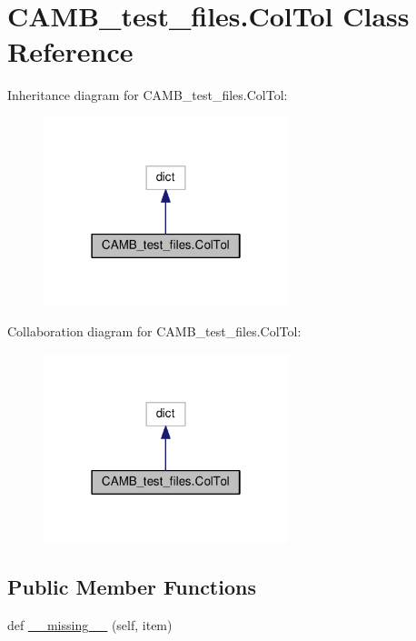 \hypertarget{classCAMB__test__files_1_1ColTol}{}\section{C\+A\+M\+B\+\_\+test\+\_\+files.\+Col\+Tol Class Reference}
\label{classCAMB__test__files_1_1ColTol}


Inheritance diagram for C\+A\+M\+B\+\_\+test\+\_\+files.\+Col\+Tol\+:
\nopagebreak
\begin{figure}[H]
\begin{center}
\leavevmode
\includegraphics[width=202pt]{classCAMB__test__files_1_1ColTol__inherit__graph}
\end{center}
\end{figure}


Collaboration diagram for C\+A\+M\+B\+\_\+test\+\_\+files.\+Col\+Tol\+:
\nopagebreak
\begin{figure}[H]
\begin{center}
\leavevmode
\includegraphics[width=202pt]{classCAMB__test__files_1_1ColTol__coll__graph}
\end{center}
\end{figure}
\subsection*{Public Member Functions}
\begin{DoxyCompactItemize}
\item 
def \mbox{\hyperlink{classCAMB__test__files_1_1ColTol_a97517c5957bda898ef93ffe971715f22}{\+\_\+\+\_\+missing\+\_\+\+\_\+}} (self, item)
\end{DoxyCompactItemize}


